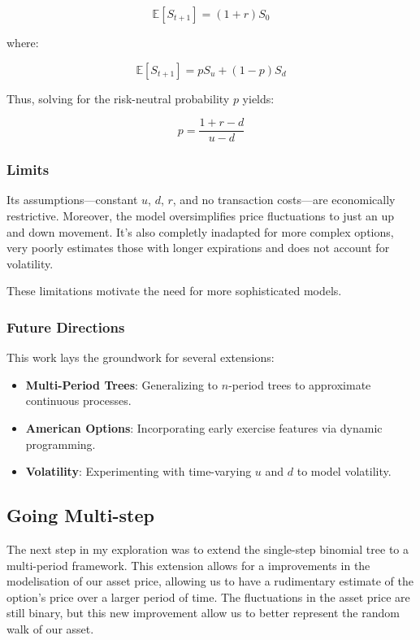 \documentclass{article}
\begin{document}
    \[
        \mathbb{E}[S_{t+1}] = (1 + r) S_0
    \]


    where:

    \[
        \mathbb{E}[S_{t+1}] = p S_u + (1 - p) S_d
    \]

    Thus, solving for the risk-neutral probability \(p\) yields:

    \[
        p = \frac{1 + r - d}{u - d}
    \]

    \subsubsection{Limits}

    Its assumptions---constant \( u \), \( d \), \( r \), and no transaction costs---are economically restrictive.
    Moreover, the model oversimplifies price fluctuations to just an up and down movement.
    It's also completly inadapted for more complex options, very poorly estimates those with longer expirations and does not account for volatility.

    \medskip

    These limitations motivate the need for more sophisticated models.

    \subsubsection{Future Directions}

    This work lays the groundwork for several extensions:

    \begin{itemize}
        \item \textbf{Multi-Period Trees}: Generalizing to \( n \)-period trees to approximate continuous processes.
        \item \textbf{American Options}: Incorporating early exercise features via dynamic programming.
        \item \textbf{Volatility}: Experimenting with time-varying \( u \) and \( d \) to model volatility.
    \end{itemize}


    \subsection{Going Multi-step}

    The next step in my exploration was to extend the single-step binomial tree to a multi-period framework.
    This extension allows for a improvements in the modelisation of our asset price, allowing us to have a rudimentary estimate of the option's price over a larger period of time.
    The fluctuations in the asset price are still binary, but this new improvement allow us to better represent the random walk of our asset.
\end{document}
